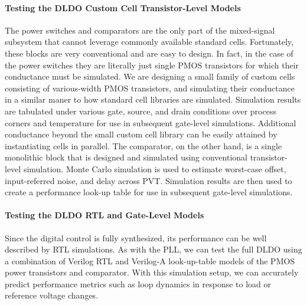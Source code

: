 \paragraph{Testing the DLDO Custom Cell Transistor-Level Models}
The power switches and comparators are the only part of the mixed-signal
subsystem that cannot leverage commonly available standard cells.
Fortunately, these blocks are very conventional and are easy to design.
In fact, in the case of the power switches they are literally just single
PMOS transistors for which their conductance must be simulated. We are
designing a small family of custom cells consisting of various-width PMOS
transistors, and simulating their conductance in a similar maner to how
standard cell libraries are simulated. Simulation results are tabulated
under various gate, source, and drain conditions over process corners and
temperature for use in subsequent gate-level simulations. Additional
conductance beyond the small custom cell library can be easily attained
by instantiating cells in parallel. The comparator, on the other hand, is
a single monolithic block that is designed and simulated using
conventional transistor-level simulation. Monte Carlo simulation is used
to estimate worst-case offset, input-referred noise, and delay across
PVT. Simulation results are then used to create a performance look-up
table for use in subsequent gate-level simulations.

\paragraph{Testing the DLDO RTL and Gate-Level Models}
Since the digital control is fully synthesized, its performance can be
well described by RTL simulations. As with the PLL, we can test the full
DLDO using a combination of Verilog RTL and Verilog-A look-up-table
models of the PMOS power transistors and comparator. With this simulation
setup, we can accurately predict performance metrics such as loop
dynamics in response to load or reference voltage changes.


